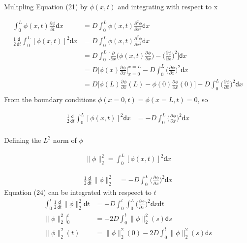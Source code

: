 \documentclass[a4paper]{article}
\newcommand*{\pd}[3][]{\ensuremath{\frac{\partial^{#1} #2}{\partial #3}}}
\begin{document}
Multpling Equation (21) by $\phi(x,t)$ and integrating with respect to x

\begin{align*}
\int_{0}^{L} \phi(x,t) \pd{\phi}{t} \mathsf{d}x &= D \int_{0}^{L} \phi(x,t)\pd[2]{\phi}{x^2} \mathsf{d}x \\
\frac{1}{2}\frac{\mathsf{d}}{\mathsf{d}t} \int_{0}^{L} [\phi(x,t)]^{2} \mathsf{d}x &= D \int_{0}^{L} \phi(x,t)\pd[2]{\phi}{x^2} \mathsf{d}x \\
&= D \int_{0}^{L} \bigg[\pd{}{x}\bigg(\phi(x,t) \pd{\phi}{x}\bigg) - \bigg(\pd{\phi}{x}\bigg)^2 \bigg] \mathsf{d}x \\
&= D \bigg[ \phi(x)\pd{\phi}{x}\bigg]_{x=0}^{x=L} - D \int_{0}^{L} \bigg(\pd{\phi}{x}\bigg)^2\mathsf{d}x \\
&= D \bigg[ \phi(L)\pd{\phi}{x}(L) - \phi(0)\pd{\phi}{x}(0)\bigg] - D \int_{0}^{L} \bigg(\pd{\phi}{x}\bigg)^2 \mathsf{d}x \\
\end{align*}
From the boundary conditions $\phi(x = 0,t) = \phi(x = L, t) = 0$, so

\begin{align*}
\frac{1}{2}\frac{\mathsf{d}}{\mathsf{d}t} \int_{0}^{L} [\phi(x,t)]^{2} \mathsf{d}x &= - D \int_{0}^{L} \bigg(\pd{\phi}{x}\bigg)^2 \mathsf{d}x \\
\end{align*}

Defining the $L^{2}$ norm of $\phi$

\begin{align*}
  \parallel \phi \parallel_{2}^{2} = \int_{0}^{L} [\phi(x,t)]^{2}\mathsf{d}x
\end{align*}

\begin{align}
\frac{1}{2}\frac{\mathsf{d}}{\mathsf{d}t} \parallel \phi \parallel_{2}^{2} &= - D \int_{0}^{L} \bigg(\pd{\phi}{x}\bigg)^2 \mathsf{d}x 
\end{align}
Equation (24) can be integrated with respeect to $t$
\begin{align*}
\int_{0}^{t} \frac{1}{2}\frac{\mathsf{d}}{\mathsf{d}t} \parallel \phi \parallel_{2}^{2} \mathsf{d}t &= - D \int_{0}^{t} \int_{0}^{L} \bigg(\pd{\phi}{x}\bigg)^2 \mathsf{d}x \mathsf{d}t \\
\parallel \phi \parallel_{2}^{2} \bigg|_{0}^{t} &= - 2D \int_{0}^{t} \parallel \phi \parallel_{2}^{2}(s) \mathsf{d}s   \\
\parallel \phi \parallel_{2}^{2} (t) &= \parallel \phi \parallel_{2}^{2} (0) - 2D \int_{0}^{t} \parallel \phi \parallel_{2}^{2}(s) \mathsf{d}s
\end{align*}
\end{document}
